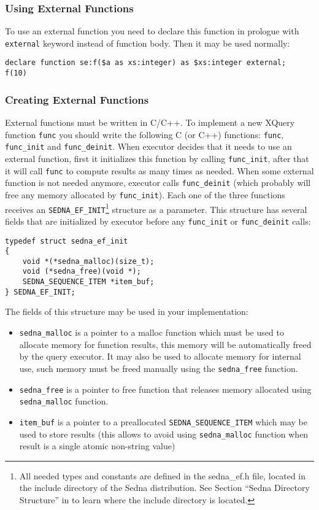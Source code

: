 \documentclass[a4paper,12pt]{article}
\begin{document}
\subsubsection*{Using External Functions}
To use an external function you need to declare this function in prologue with
\verb!external! keyword instead of function body. Then it may be used normally:

\small{
\begin{verbatim}
declare function se:f($a as xs:integer) as $xs:integer external;
f(10)
\end{verbatim}}


\subsubsection*{Creating External Functions}
External functions must be written in C/C++. To implement a new XQuery function
\verb!func! you should write the following C (or C++) functions: \verb!func!,
\verb!func_init! and \verb!func_deinit!. When executor decides that it needs to
use an external function, first it initializes this function by calling
\verb!func_init!, after that it will call \verb!func! to compute results as many
times as needed. When some external function is not needed anymore, executor
calls \verb!func_deinit! (which probably will free any memory allocated by
\verb!func_init!). Each one of the three functions receives an
\verb!SEDNA_EF_INIT!\footnote{All needed types and constants are defined in the
sedna\_ef.h file, located in the include directory of the Sedna distribution.
See Section ``Sedna Directory Structure'' in \cite{doc:admin} to learn where the
include directory is located.} structure as a parameter. This structure has
several fields that are initialized by executor before any \verb!func_init! or
\verb!func_deinit! calls:
\begin{verbatim}
typedef struct sedna_ef_init
{
    void *(*sedna_malloc)(size_t);
    void (*sedna_free)(void *);
    SEDNA_SEQUENCE_ITEM *item_buf;
} SEDNA_EF_INIT;
\end{verbatim}
The fields of this structure may be used in your implementation:
\begin{itemize}
\item \verb!sedna_malloc! is a pointer to a malloc function which must be used
to allocate memory for function results, this memory will be automatically freed
by the query executor. It may also be used to allocate memory for internal use,
such memory must be freed manually using the \verb!sedna_free! function.
\item \verb!sedna_free! is a pointer to free function that releases memory
allocated using \verb!sedna_malloc! function.
\item \verb!item_buf! is a pointer to a preallocated \verb!SEDNA_SEQUENCE_ITEM!
which may be used to store results (this allows to avoid using
\verb!sedna_malloc! function when result is a single atomic non-string value)
\end{itemize}
\end{document}
